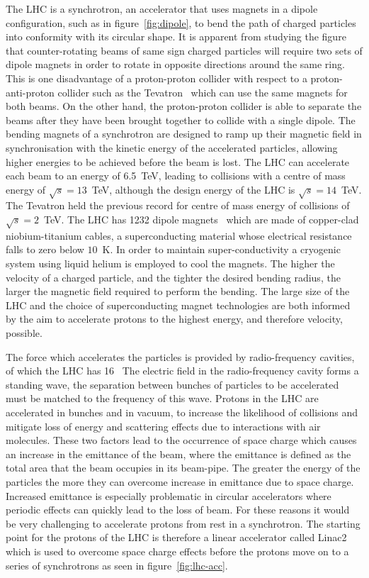 The LHC is a synchrotron, an accelerator that uses magnets in a dipole
configuration, such as in figure~\ref{fig:dipole}, to bend the path of charged
particles into conformity with its circular shape. It is apparent from studying
the figure that counter-rotating beams of same sign charged particles will
require two sets of dipole magnets in order to rotate in opposite directions
around the same ring. This is one disadvantage of a proton-proton collider with
respect to a proton-anti-proton collider such as the Tevatron~\cite{tevatron-01}
which can use the same magnets for both beams. On the other hand, the
proton-proton collider is able to separate the beams after they have been
brought together to collide with a single dipole. The bending magnets of a
synchrotron are designed to ramp up their magnetic field in synchronisation
with the kinetic energy of the accelerated particles, allowing higher energies
to be achieved before the beam is lost. The LHC can accelerate each beam to an
energy of 6.5~TeV, leading to collisions with a centre of mass energy of
$\sqrt{s} = 13 $~TeV, although the design energy of the LHC is $\sqrt{s} = 14
$~TeV. The Tevatron held the previous record for centre of mass energy of
collisions of $\sqrt{s} = 2 $~TeV. The LHC has 1232 dipole magnets~\cite{LHC-dr}
which are made of copper-clad niobium-titanium cables, a superconducting
material whose electrical resistance falls to zero below $10$~K. In order to
maintain super-conductivity a cryogenic system using liquid helium is employed
to cool the magnets. The higher the velocity of a charged particle, and the
tighter the desired bending radius, the larger the magnetic field required to
perform the bending. The large size of the LHC and the choice of superconducting
magnet technologies are both informed by the aim to accelerate protons to the
highest energy, and therefore velocity, possible.


The force which accelerates the particles is provided by radio-frequency
cavities, of which the LHC has 16~\cite{LHC-dr} The electric field in the
radio-frequency cavity forms a standing wave, the separation between bunches of
particles to be accelerated must be matched to the frequency of this wave.
Protons in the LHC are accelerated in bunches and in vacuum, to increase
the likelihood of collisions and mitigate loss of energy and scattering effects
due to interactions with air molecules. These two factors lead to the occurrence
of space charge which causes an increase in the emittance of the beam, where the
emittance is defined as the total area that the beam occupies in its beam-pipe.
The greater the energy of the particles the more they can overcome increase in
emittance due to space charge. Increased emittance is especially problematic in
circular accelerators where periodic effects can quickly lead to the loss of
beam. For these reasons it would be very challenging to accelerate protons from
rest in a synchrotron. The starting point for the protons of the LHC is
therefore a linear accelerator called Linac2 which is used to overcome space
charge effects before the protons move on to a series of synchrotrons as seen in
figure~\ref{fig:lhc-acc}.


